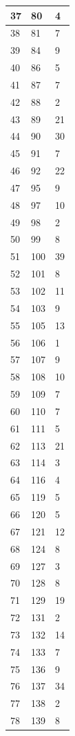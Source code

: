 \begin{tabular}{p{}p{}p{}}
37 & 80 & 4 \\
\hline
38 & 81 & 7 \\
\hline
39 & 84 & 9 \\
\hline
40 & 86 & 5 \\
\hline
41 & 87 & 7 \\
\hline
42 & 88 & 2 \\
\hline
43 & 89 & 21 \\
\hline
44 & 90 & 30 \\
\hline
45 & 91 & 7 \\
\hline
46 & 92 & 22 \\
\hline
47 & 95 & 9 \\
\hline
48 & 97 & 10 \\
\hline
49 & 98 & 2 \\
\hline
50 & 99 & 8 \\
\hline
51 & 100 & 39 \\
\hline
52 & 101 & 8 \\
\hline
53 & 102 & 11 \\
\hline
54 & 103 & 9 \\
\hline
55 & 105 & 13 \\
\hline
56 & 106 & 1 \\
\hline
57 & 107 & 9 \\
\hline
58 & 108 & 10 \\
\hline
59 & 109 & 7 \\
\hline
60 & 110 & 7 \\
\hline
61 & 111 & 5 \\
\hline
62 & 113 & 21 \\
\hline
63 & 114 & 3 \\
\hline
64 & 116 & 4 \\
\hline
65 & 119 & 5 \\
\hline
66 & 120 & 5 \\
\hline
67 & 121 & 12 \\
\hline
68 & 124 & 8 \\
\hline
69 & 127 & 3 \\
\hline
70 & 128 & 8 \\
\hline
71 & 129 & 19 \\
\hline
72 & 131 & 2 \\
\hline
73 & 132 & 14 \\
\hline
74 & 133 & 7 \\
\hline
75 & 136 & 9 \\
\hline
76 & 137 & 34 \\
\hline
77 & 138 & 2 \\
\hline
78 & 139 & 8 \\

\end{tabular}
